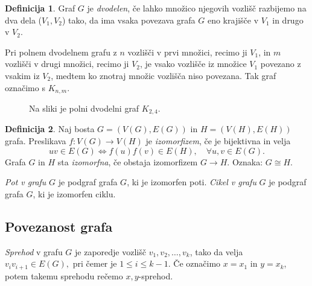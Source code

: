 \documentclass[12pt,a4paper]{amsart}
\theoremstyle{definition} %
\newtheorem{definicija}{Definicija}[section]
\theoremstyle{plain} %
\newcommand{\N}{\mathbb N}
\newcommand{\graf}[1][G]{\ensuremath{#1 = (V(#1), E(#1))}}
\newcommand{\vozlisca}[1][G]{\ensuremath{V(#1)}}
\newcommand{\povezave}[1][G]{\ensuremath{E(#1)}}
\begin{document}
\begin{definicija}
    Graf $G$ je \emph{dvodelen}, če lahko množico njegovih vozlišč razbijemo na dva dela ($V_1,V_2$) tako, da ima vsaka povezava grafa $G$ eno krajišče v $V_1$ in drugo v $V_2$.
\end{definicija}

Pri polnem dvodelnem grafu z $n$ vozlišči v prvi množici, recimo ji $V_1$, in $m$ vozlišči v drugi množici, recimo ji $V_2$, je vsako vozlišče iz množice $V_1$ povezano z vsakim iz $V_2$, medtem ko znotraj množic vozlišča niso povezana. Tak graf označimo s $K_{n,m}$.

\begin{figure}[h]
    \caption{Na sliki je polni dvodelni graf $K_{2,4}$.}
\end{figure}

\begin{definicija}
	Naj bosta $\graf$ in $\graf[H]$ grafa. 
	Preslikava $f\colon \vozlisca \to \vozlisca[H]$ je \emph{izomorfizem}, če je bijektivna in velja
	\[ uv \in \povezave \iff f(u)f(v) \in \povezave[H],\quad \forall u, v \in \povezave. \]
	Grafa $G$ in $H$ sta \emph{izomorfna}, če obstaja izomorfizem $G \to H$. Oznaka: $G \cong H$.
\end{definicija}

\emph{Pot v grafu} $G$ je podgraf grafa $G$, ki je izomorfen poti.
\emph{Cikel v grafu} $G$ je podgraf grafa $G$, ki je izomorfen ciklu. 

\subsection{Povezanost grafa}

\emph{Sprehod} v grafu $G$ je zaporedje vozlišč $v_1, v_2, \ldots, v_k$, tako da velja $v_i v_{i+1} \in E(G),$ pri čemer je $1 \leq i \leq k-1$. Če označimo $x = x_1$ in $y = x_k$, potem takemu sprehodu rečemo $x,y$-sprehod.
\end{document}
